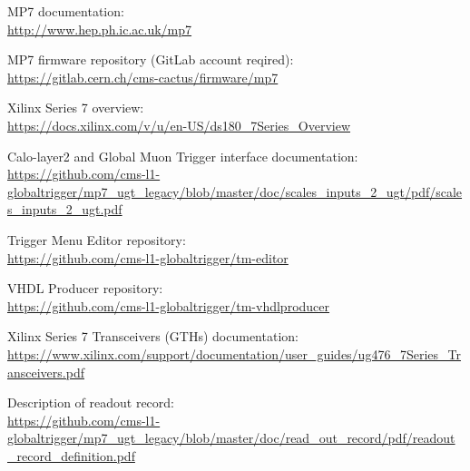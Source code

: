 \documentclass[11pt,a4paper,english,titlepage]{article}
\begin{document}
    \doctitlepage{}

    

    \doctoc{}

    
    
    
    
    
    
    
    

    \doctables{}

    \docfigures{}


    \clearpage

    \begin{thebibliography}{00}

    MP7 documentation:\\
    \url{http://www.hep.ph.ic.ac.uk/mp7}

    MP7 firmware repository (GitLab account reqired):\\
    \url{https://gitlab.cern.ch/cms-cactus/firmware/mp7}

    Xilinx Series 7 overview:\\
    \url{https://docs.xilinx.com/v/u/en-US/ds180_7Series_Overview}

    Calo-layer2 and Global Muon Trigger interface documentation:\\
    \url{https://github.com/cms-l1-globaltrigger/mp7_ugt_legacy/blob/master/doc/scales_inputs_2_ugt/pdf/scales_inputs_2_ugt.pdf}

    Trigger Menu Editor repository:\\
    \url{https://github.com/cms-l1-globaltrigger/tm-editor}

    VHDL Producer repository:\\
    \url{https://github.com/cms-l1-globaltrigger/tm-vhdlproducer}

    Xilinx Series 7 Transceivers (GTHs) documentation:\\
    \url{https://www.xilinx.com/support/documentation/user_guides/ug476_7Series_Transceivers.pdf}

    Description of readout record:\\
    \url{https://github.com/cms-l1-globaltrigger/mp7_ugt_legacy/blob/master/doc/read_out_record/pdf/readout_record_definition.pdf}

    \end{thebibliography}

\end{document}
